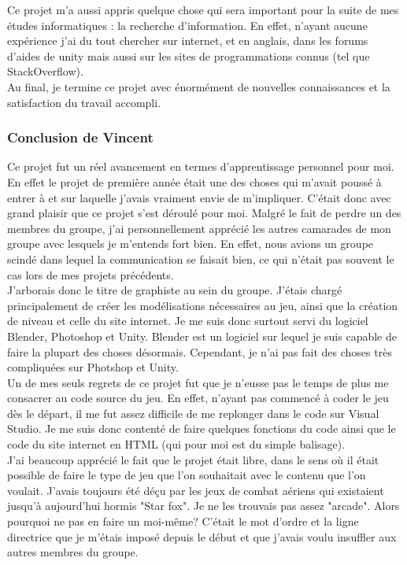 \documentclass[12pt, titlepage]{article}
\begin{document}
\begin{spacing}{1.5}
Ce projet m'a aussi appris quelque chose qui sera important pour la suite de mes études informatiques : la recherche d'information. En effet, n'ayant aucune expérience j'ai du tout chercher sur internet, et en anglais, dans les forums d'aides de unity mais aussi sur les sites de programmations connus (tel que StackOverflow). \\

Au final, je termine ce projet avec énormément de nouvelles connaissances et la satisfaction du travail accompli.

\subsubsection{Conclusion de Vincent}

Ce projet fut un réel avancement en termes d’apprentissage personnel pour moi. En effet le projet de première année était une des choses qui m’avait poussé à entrer à  et sur laquelle j’avais vraiment envie de m’impliquer. C’était donc avec grand plaisir que ce projet s’est déroulé pour moi. Malgré le fait de perdre un des membres du groupe, j’ai personnellement apprécié les autres camarades de mon groupe avec lesquels je m’entends fort bien. En effet, nous avions un groupe scindé dans lequel la communication se faisait bien, ce qui n’était pas souvent le cas lors de mes projets précédents.\\

J’arborais donc le titre de graphiste au sein du groupe. J’étais chargé principalement de créer les modélisations nécessaires au jeu, ainsi que la création de niveau et celle du site internet. Je me suis donc surtout servi du logiciel Blender, Photoshop et Unity. Blender est un logiciel sur lequel je suis capable de faire la plupart des choses désormais. Cependant, je n’ai pas fait des choses très compliquées sur Photshop et Unity.\\

Un de mes seuls regrets de ce projet fut que je n’eusse pas le temps de plus me consacrer au code source du jeu. En effet, n’ayant pas commencé à coder le jeu dès le départ, il me fut assez difficile de me replonger dans le code sur Visual Studio. Je me suis donc contenté de faire quelques fonctions du code ainsi que le code du site internet en HTML (qui pour moi est du simple balisage).\\

J’ai beaucoup apprécié le fait que le projet était libre, dans le sens où il était possible de faire le type de jeu que l’on souhaitait avec le contenu que l’on voulait. J’avais toujours été déçu par les jeux de combat aériens qui existaient jusqu’à aujourd’hui hormis "Star fox". Je ne les trouvais pas assez "arcade". Alors pourquoi ne pas en faire un moi-même? C’était le mot d’ordre et la ligne directrice que je m’étais imposé depuis le début et que j’avais voulu insuffler aux autres membres du groupe.\\


\end{spacing}
\end{document}
